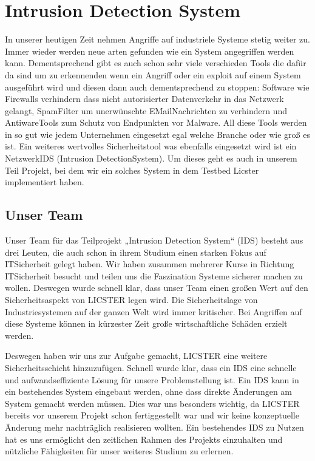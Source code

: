 \documentclass[letterpaper,10pt,ngerman]{sphinxmanual}
\begin{document}
\noindent{}


\section{Intrusion Detection System}
\label{\detokenize{ids:intrusion-detection-system}}\label{\detokenize{ids::doc}}
In unserer heutigen Zeit nehmen Angriffe auf industriele Systeme stetig weiter zu.
Immer wieder werden neue arten gefunden wie ein System angegriffen werden kann.
Dementsprechend gibt es auch schon sehr viele verschieden Tools die dafür da sind um
zu erkennenden wenn ein Angriff oder ein exploit auf einem System ausgeführt wird und
diesen dann auch dementsprechend zu stoppen:  Software wie Firewalls verhindern dass
nicht autorisierter Datenverkehr in das Netzwerk gelangt, Spam\sphinxhyphen{}Filter um unerwünschte
E\sphinxhyphen{}Mail\sphinxhyphen{}Nachrichten zu verhindern und Antiware\sphinxhyphen{}Tools zum Schutz von Endpunkten vor Malware.
All diese Tools werden in so gut wie jedem Unternehmen eingesetzt egal welche Branche
oder wie groß es ist. Ein weiteres wertvolles Sicherheitstool was ebenfalls eingesetzt
wird ist ein Netzwerk\sphinxhyphen{}IDS (Intrusion Detection\sphinxhyphen{}System). Um dieses geht es auch in unserem
Teil Projekt, bei dem wir ein solches System in dem Testbed Licster implementiert haben.


\subsection{Unser Team}
\label{\detokenize{ids:unser-team}}
Unser Team für das Teilprojekt „Intrusion Detection System“ (IDS) besteht aus drei Leuten, die auch schon in ihrem Studium einen starken Fokus auf IT\sphinxhyphen{}Sicherheit gelegt haben. Wir haben zusammen mehrerer Kurse in Richtung IT\sphinxhyphen{}Sicherheit besucht und teilen uns die Faszination Systeme sicherer machen zu wollen. Deswegen wurde schnell klar, dass unser Team einen großen Wert auf den Sicherheitsaspekt von LICSTER legen wird.
Die Sicherheitslage von Industriesystemen auf der ganzen Welt wird immer kritischer. Bei Angriffen auf diese Systeme können in kürzester Zeit große wirtschaftliche Schäden erzielt werden.

\noindent{}

Deswegen haben wir uns zur Aufgabe gemacht, LICSTER eine weitere Sicherheitsschicht hinzuzufügen. Schnell wurde klar, dass ein IDS eine schnelle und aufwandseffiziente Lösung für unsere Problemstellung ist. Ein IDS kann in ein bestehendes System eingebaut werden, ohne dass direkte Änderungen am System gemacht werden müssen. Dies war uns besonders wichtig, da LICSTER bereits vor unserem Projekt schon fertiggestellt war und wir keine konzeptuelle Änderung mehr nachträglich realisieren wollten. Ein bestehendes IDS zu Nutzen hat es uns ermöglicht den zeitlichen Rahmen des Projekts einzuhalten und nützliche Fähigkeiten für unser weiteres Studium zu erlernen.
\end{document}
